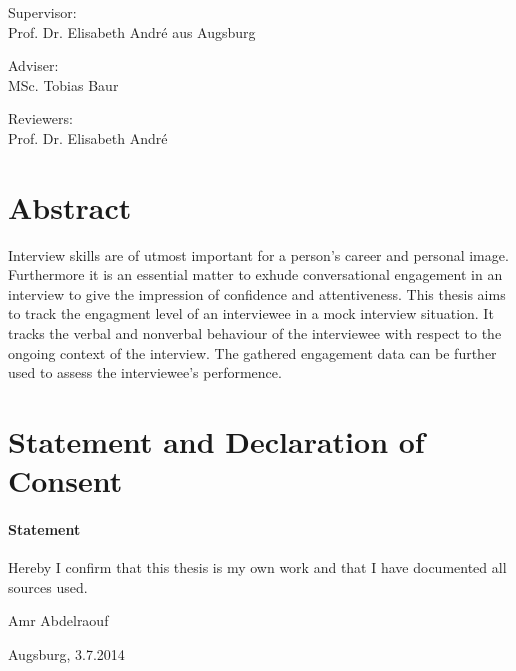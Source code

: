 \documentclass[12pt, a4paper, fleqn]{memoir}%
\begin{document}
\vspace{2.0em}
\begin{center}
    \normalsize
    Supervisor:\\ 
    Prof. Dr. Elisabeth Andr\'{e} aus Augsburg
\end{center}
\begin{center}
    \normalsize
    Adviser:\\
    MSc. Tobias Baur
\end{center}
\begin{center}
    \normalsize
    Reviewers:\\
    Prof. Dr. Elisabeth Andr\'{e}\\
\end{center}
\cleardoublepage

\chapter*{Abstract}
Interview skills are of utmost important for a person's career and personal image. Furthermore it is an essential matter to exhude conversational engagement in an interview to give the impression of confidence and attentiveness. This thesis aims to track the engagment level of an interviewee in a mock interview situation. It tracks the verbal and nonverbal behaviour of the interviewee with respect to the ongoing context of the interview. The gathered engagement data can be further used to assess the interviewee's performence.

\chapter*{Statement and Declaration of Consent}
\vfill
\subsubsection*{\LARGE Statement}
Hereby I confirm that this thesis is my own work and that I have documented all sources used.
\vfill
\begin{flushleft}
Amr Abdelraouf
\end{flushleft}  
\begin{flushright}
Augsburg, 3.7.2014 
\end{flushright}
\vfill
\vfill
\end{document}
